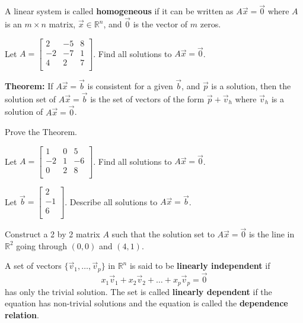 \newpage


\begin{defn}
A linear system is called {\bf homogeneous} if it can be written as $A\vec{x}=\vec{0}$ where $A$ is an $m \times n$ matrix, $\vec{x} \in \mathbb{R}^n$, and $\vec{0}$ is the vector of $m$ zeros. 
\end{defn}

\begin{enumerate}

\Problem  Let $A=\begin{bmatrix} 2 & -5 & 8\\ -2 & -7 & 1\\ 4& 2 & 7\\ \end{bmatrix}$. Find all solutions to $A\vec{x} = \vec{0}$.

\newpage

{\bf Theorem:} If $A\vec{x} =\vec{b}$ is consistent for a given $\vec{b}$, and $\vec{p}$ is a solution, then the solution set of $A\vec{x}=\vec{b}$ is the set of vectors of the form $\vec{p}+\vec{v}_h$ where $\vec{v}_h$ is a solution of $A\vec{x} =\vec{0}$.

\Problem Prove the Theorem.

\newpage

\Problem Let $A=\begin{bmatrix} 1 & 0 & 5\\ -2 & 1 & -6\\ 0 & 2 & 8\\ \end{bmatrix}$. 
\Part Find all solutions to $A\vec{x} = \vec{0}$.

\vfill

\Part Let $\vec{b}=\begin{bmatrix} 2\\-1\\6\\\end{bmatrix}$. Describe all solutions to $A\vec{x} =\vec{b}$.

\vfill

\Problem Construct a 2 by 2 matrix $A$ such that the solution set to $A\vec{x}=\vec{0}$ is the line in $\mathbb{R}^2$ going through $(0,0)$ and $(4,1)$.

\vfill


\newpage

\begin{defn}
A set of vectors $\{ \vec{v}_1, \dots, \vec{v}_p\}$ in $\mathbb{R}^n$ is said to be {\bf linearly independent} if $$x_1 \vec{v}_1 +x_2 \vec{v}_2 +\dots +x_p \vec{v}_p = \vec{0}$$ has only the trivial solution. The set is called {\bf linearly dependent} if the equation has non-trivial solutions and the equation is called the {\bf dependence relation}.
\end{defn}


\end{enumerate}
